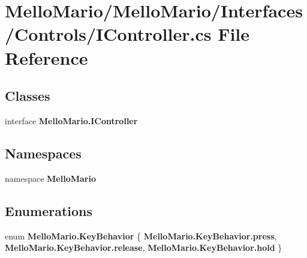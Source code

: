 \section{Mello\+Mario/\+Mello\+Mario/\+Interfaces/\+Controls/\+I\+Controller.cs File Reference}
\label{IController_8cs}
\subsection*{Classes}
\begin{DoxyCompactItemize}
\item 
interface \textbf{ Mello\+Mario.\+I\+Controller}
\end{DoxyCompactItemize}
\subsection*{Namespaces}
\begin{DoxyCompactItemize}
\item 
namespace \textbf{ Mello\+Mario}
\end{DoxyCompactItemize}
\subsection*{Enumerations}
\begin{DoxyCompactItemize}
\item 
enum \textbf{ Mello\+Mario.\+Key\+Behavior} \{ \textbf{ Mello\+Mario.\+Key\+Behavior.\+press}, 
\textbf{ Mello\+Mario.\+Key\+Behavior.\+release}, 
\textbf{ Mello\+Mario.\+Key\+Behavior.\+hold}
 \}
\end{DoxyCompactItemize}
